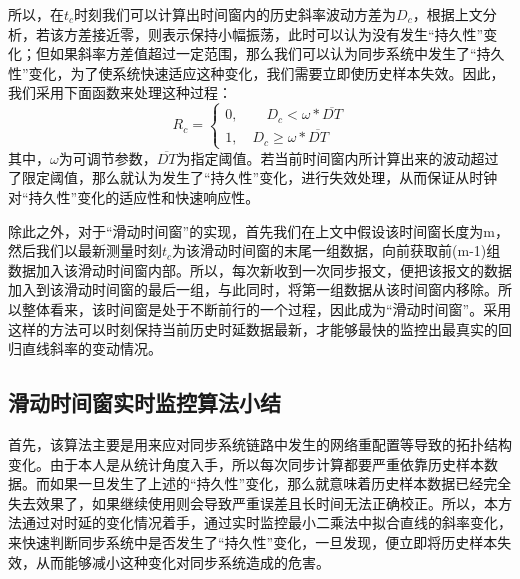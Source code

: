 所以，在$t_{c}$时刻我们可以计算出时间窗内的历史斜率波动方差为$D_{c}$，根据上文分析，若该方差接近零，则表示保持小幅振荡，此时可以认为没有发生“持久性”变化；但如果斜率方差值超过一定范围，那么我们可以认为同步系统中发生了“持久性”变化，为了使系统快速适应这种变化，我们需要立即使历史样本失效。因此，我们采用下面函数来处理这种过程：
\begin{equation}
R_{c} = \left\{
	\begin{array}{ll} %
		0, \qquad D_{c} < \omega * \overline{DT} \\
		1, \quad D_{c} \geq \omega * \overline{DT} 
	\end{array}
	\right. 
\end{equation}
其中，$\omega$为可调节参数，$\overline{DT}$为指定阈值。若当前时间窗内所计算出来的波动超过了限定阈值，那么就认为发生了“持久性”变化，进行失效处理，从而保证从时钟对“持久性”变化的适应性和快速响应性。

除此之外，对于“滑动时间窗”的实现，首先我们在上文中假设该时间窗长度为m，然后我们以最新测量时刻$t_{c}$为该滑动时间窗的末尾一组数据，向前获取前(m-1)组数据加入该滑动时间窗内部。所以，每次新收到一次同步报文，便把该报文的数据加入到该滑动时间窗的最后一组，与此同时，将第一组数据从该时间窗内移除。所以整体看来，该时间窗是处于不断前行的一个过程，因此成为“滑动时间窗”。采用这样的方法可以时刻保持当前历史时延数据最新，才能够最快的监控出最真实的回归直线斜率的变动情况。

\subsection{滑动时间窗实时监控算法小结}
首先，该算法主要是用来应对同步系统链路中发生的网络重配置等导致的拓扑结构变化。由于本人是从统计角度入手，所以每次同步计算都要严重依靠历史样本数据。而如果一旦发生了上述的“持久性”变化，那么就意味着历史样本数据已经完全失去效果了，如果继续使用则会导致严重误差且长时间无法正确校正。所以，本方法通过对时延的变化情况着手，通过实时监控最小二乘法中拟合直线的斜率变化，来快速判断同步系统中是否发生了“持久性”变化，一旦发现，便立即将历史样本失效，从而能够减小这种变化对同步系统造成的危害。

